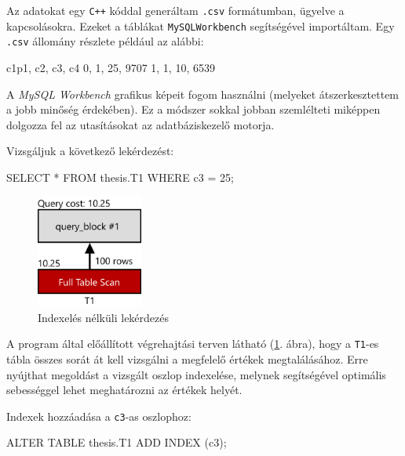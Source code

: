 


Az adatokat egy \texttt{C++} kóddal generáltam \texttt{.csv} formátumban, ügyelve a kapcsolásokra. Ezeket a táblákat \texttt{MySQLWorkbench} segítségével importáltam.
Egy \texttt{.csv} állomány részlete például az alábbi:
\begin{python}
c1p1, c2, c3, c4
0, 1, 25, 9707
1, 1, 10, 6539
\end{python}

\newpage


A \textit{MySQL Workbench} grafikus képeit fogom használni (melyeket átszerkesztettem a jobb minőség érdekében). Ez a módszer sokkal jobban szemlélteti miképpen dolgozza fel az utasításokat az adatbáziskezelő motorja.


Vizsgáljuk a következő lekérdezést:
\begin{python}
SELECT * FROM thesis.T1 WHERE c3 = 25; 
\end{python}
\begin{figure}[h!]
\centering
\includegraphics[width=3.5cm]{images/explain/1-1.png}
\caption{Indexelés nélküli lekérdezés}
\label{fig:explain_1_1}
\end{figure}

A program által előállított végrehajtási terven látható (\ref{fig:explain_1_1}. ábra), hogy a \texttt{T1}-es tábla összes sorát át kell vizsgálni a megfelelő értékek megtalálásához. Erre nyújthat megoldást a vizsgált oszlop indexelése, melynek segítségével optimális sebességgel lehet meghatározni az értékek helyét.

Indexek hozzáadása a \texttt{c3}-as oszlophoz:
\begin{python} 
ALTER TABLE thesis.T1 ADD INDEX (c3);
\end{python}


